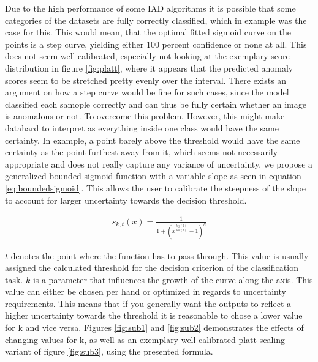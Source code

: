 Due to the high performance of some IAD algorithms it is possible that some categories 
of the datasets are fully correctly classified, which in example was the case for this. This would mean, that the optimal fitted sigmoid curve on the points 
is a step curve, yielding either 100 percent confidence or none at all. This does not seem well calibrated, especially not looking at the exemplary score distribution in figure \ref{fig:platt}, where it 
appears that the predicted anomaly scores seem to be stretched pretty evenly over the interval. There exists an argument on how a step 
curve would be fine for such cases, since the model classified each samople correctly and can thus be fully certain whether an 
image is anomalous or not. To overcome this problem. However, this might make datahard to interpret as everything inside one class 
would have the same certainty. In example, a point barely above the threshold would have the same certainty as the point furthest away from it, 
which seems not necessarily appropriate and does not really capture any variance of uncertainty.
we propose a generalized bounded sigmoid function with a variable slope \cite{bounded_sigmoid} as seen in equation \ref{eq:boundedsigmoid}. This allows the user to calibrate the steepness of the slope to account for larger uncertainty 
towards the decision threshold.

\begin{equation}
    \label{eq:boundedsigmoid}
    \begin{split}
        s_{k, t}(x) = \frac{1}{1 + (x^{\frac{log(2)}{log(t)}} - 1)^{k}}
    \end{split}
\end{equation}

$t$ denotes the point where the function has to pass through. This value is usually assigned the calculated threshold for the decision criterion of the classification task. $k$ is a parameter 
that influences the growth of the curve along the axis. This value can either be chosen per hand or optimized in regards to uncertainty requirements. This means that if you generally want the 
outputs to reflect a higher uncertainty towards the threshold it is reasonable to chose a lower value for k and vice versa. Figures \ref{fig:sub1} and \ref{fig:sub2} demonstrates the effects of changing values for k, as well 
as an exemplary well calibrated platt scaling variant of figure \ref{fig:sub3}, using the presented formula.

